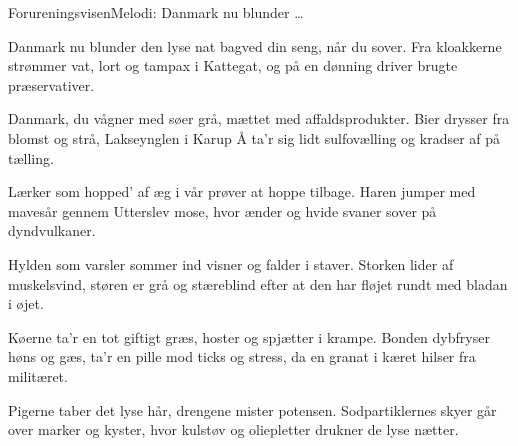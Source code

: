 \begin{sang}{Forureningsvisen}{Melodi: Danmark nu blunder \ldots}
\begin{vers}
Danmark nu blunder den lyse nat
bagved din seng, når du sover.
Fra kloakkerne strømmer vat,
lort og tampax i Kattegat,
og på en dønning driver 
brugte præservativer.
\end{vers}
\begin{vers}
Danmark, du vågner med søer grå,
mættet med affaldsprodukter.
Bier drysser fra blomst og strå,
Lakseynglen i Karup Å
ta'r sig lidt sulfovælling 
og kradser af på tælling.
\end{vers}
\begin{vers}
Lærker som hopped' af æg i vår
prøver at hoppe tilbage.
Haren jumper med mavesår
gennem Utterslev mose, hvor
ænder og hvide svaner 
sover på dyndvulkaner.
\end{vers}
\begin{vers}
Hylden som varsler sommer ind
visner og falder i staver.
Storken lider af muskelsvind,
støren er grå og stæreblind
efter at den har fløjet
rundt med bladan i øjet.
\end{vers}
\begin{vers}
Køerne ta'r en tot giftigt græs,
hoster og spjætter i krampe.
Bonden dybfryser høns og gæs,
ta'r en pille mod ticks og stress,
da en granat i kæret
hilser fra militæret.
\end{vers}
\begin{vers}
Pigerne taber det lyse hår,
drengene mister potensen.
Sodpartiklernes skyer går
over marker og kyster, hvor
kulstøv og oliepletter
drukner de lyse nætter.
\end{vers}
\laps
\end{sang}
